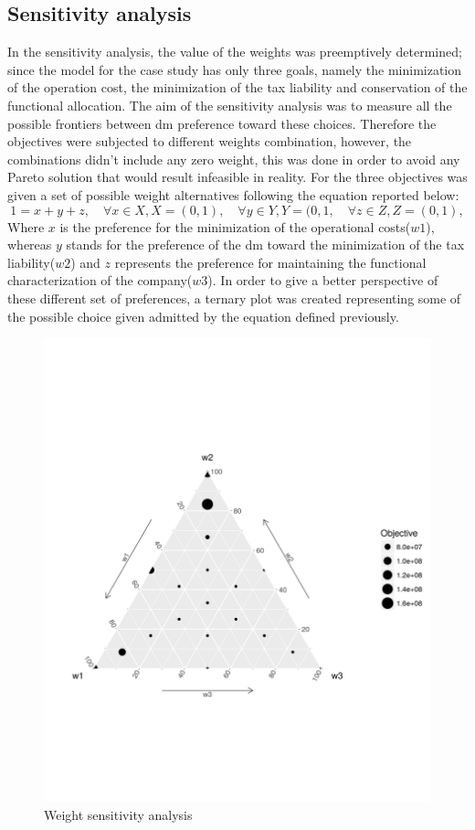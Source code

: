 \begin{doublespace}
\subsection{Sensitivity analysis}
In the sensitivity analysis, the value of the weights was preemptively determined; since the model for the case study has only three goals, namely the minimization of the operation cost, the minimization of the tax liability and conservation of the functional allocation. The aim of the sensitivity analysis was to measure all the possible frontiers between \gls{dm} preference toward these choices. Therefore the objectives were subjected to different weights combination, however, the combinations didn't include any zero weight, this was done in order to avoid any Pareto solution that would result infeasible in reality. For the three objectives was given a set of possible weight alternatives following the equation reported below:
$$
1=x + y + z, \quad \forall x \in X, X = (0,1), \quad \forall y \in Y, Y = (0,1, \quad \forall z \in Z, Z = (0,1),
$$
Where $x$ is the preference for the minimization of the operational costs($w1$), whereas $y$ stands for the preference of the \gls{dm} toward the minimization of the tax liability($w2$) and $z$ represents the preference for maintaining the functional characterization of the company($w3$).
In order to give a better perspective of these different set of preferences, a ternary plot was created representing some of the possible choice given admitted by the equation defined previously.

\begin{figure}[h]
\centering
\includegraphics[width=0.7\linewidth]{Images/ternary.png}
\caption{Weight sensitivity analysis}
\end{figure}


\end{doublespace}
